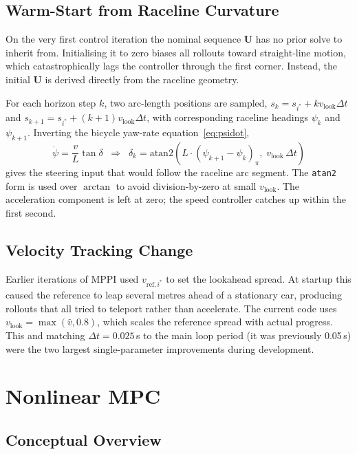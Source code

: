 \documentclass[11pt]{article}
\begin{document}
\subsection{Warm-Start from Raceline Curvature}

On the very first control iteration the nominal sequence $\bm{U}$ has no prior
solve to inherit from.  Initialising it to zero biases all rollouts toward
straight-line motion, which catastrophically lags the controller through the
first corner.  Instead, the initial $\bm{U}$ is derived directly from the
raceline geometry.

For each horizon step $k$, two arc-length positions are sampled,
$s_k = s_{i^*} + k v_{\text{look}} \Delta t$ and
$s_{k+1} = s_{i^*} + (k+1) v_{\text{look}} \Delta t$, with corresponding
raceline headings $\psi_k$ and $\psi_{k+1}$.  Inverting the bicycle yaw-rate
equation~\eqref{eq:psidot},
\[
\dot{\psi} = \frac{v}{L}\tan\delta
\;\;\Longrightarrow\;\;
\delta_k = \mathrm{atan2}\!\left(L \cdot (\psi_{k+1} - \psi_k)_{\pi},\; v_{\text{look}}\,\Delta t\right)
\]
gives the steering input that would follow the raceline arc segment.  The
\texttt{atan2} form is used over $\arctan$ to avoid division-by-zero at small
$v_{\text{look}}$.  The acceleration component is left at zero; the speed
controller catches up within the first second.

\subsection{Velocity Tracking Change}

Earlier iterations of MPPI used $v_{\text{ref},i^*}$ to set the lookahead
spread.  At startup this caused the reference to leap several metres ahead of
a stationary car, producing rollouts that all tried to teleport rather than
accelerate.  The current code uses $v_{\text{look}} = \max(\hat{v}, 0.8)$,
which scales the reference spread with actual progress.  This and matching
$\Delta t = 0.025$\,s to the main loop period (it was previously 0.05\,s) were
the two largest single-parameter improvements during development.


\section{Nonlinear MPC}

\subsection{Conceptual Overview}
\end{document}
